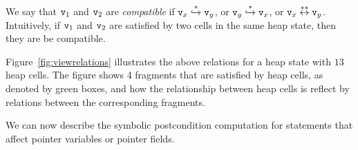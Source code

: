 We say that $\mathtt{v}_1$ and $\mathtt{v}_2$ are {\em compatible} if $\mathtt{v}_x \overset{*}\hookrightarrow \mathtt{v}_y$, or $\mathtt{v}_y \overset{*}\hookrightarrow \mathtt{v}_x$, or $\mathtt{v}_x \overset{**}\leftrightarrow \mathtt{v}_y$. Intuitively, if $\mathtt{v}_1$ and
$\mathtt{v}_2$ are satisfied by two cells in the same heap state, then they are
be compatible.

Figure~\ref{fig:viewrelations} illustrates the above relations for a heap state
with $13$ heap cells. The figure shows 4 fragments that are satisfied by heap
cells, as denoted by green boxes, and how the relationship between heap cells
is reflect by relations between the corresponding fragments.

We can now describe the symbolic postcondition computation for
statements that affect pointer variables or pointer fields.


